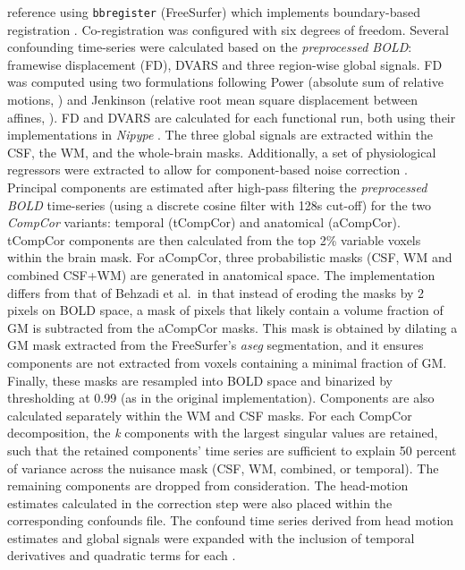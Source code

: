 \documentclass[
]{article}
\begin{document}
\begin{description}
reference using \texttt{bbregister} (FreeSurfer) which implements
boundary-based registration \citep{bbr}. Co-registration was configured
with six degrees of freedom. Several confounding time-series were
calculated based on the \emph{preprocessed BOLD}: framewise displacement
(FD), DVARS and three region-wise global signals. FD was computed using
two formulations following Power (absolute sum of relative motions,
\citet{power_fd_dvars}) and Jenkinson (relative root mean square
displacement between affines, \citet{mcflirt}). FD and DVARS are
calculated for each functional run, both using their implementations in
\emph{Nipype} \citep[following the definitions by][]{power_fd_dvars}.
The three global signals are extracted within the CSF, the WM, and the
whole-brain masks. Additionally, a set of physiological regressors were
extracted to allow for component-based noise correction
\citep[\emph{CompCor},][]{compcor}. Principal components are estimated
after high-pass filtering the \emph{preprocessed BOLD} time-series
(using a discrete cosine filter with 128s cut-off) for the two
\emph{CompCor} variants: temporal (tCompCor) and anatomical (aCompCor).
tCompCor components are then calculated from the top 2\% variable voxels
within the brain mask. For aCompCor, three probabilistic masks (CSF, WM
and combined CSF+WM) are generated in anatomical space. The
implementation differs from that of Behzadi et al.~in that instead of
eroding the masks by 2 pixels on BOLD space, a mask of pixels that
likely contain a volume fraction of GM is subtracted from the aCompCor
masks. This mask is obtained by dilating a GM mask extracted from the
FreeSurfer's \emph{aseg} segmentation, and it ensures components are not
extracted from voxels containing a minimal fraction of GM. Finally,
these masks are resampled into BOLD space and binarized by thresholding
at 0.99 (as in the original implementation). Components are also
calculated separately within the WM and CSF masks. For each CompCor
decomposition, the \emph{k} components with the largest singular values
are retained, such that the retained components' time series are
sufficient to explain 50 percent of variance across the nuisance mask
(CSF, WM, combined, or temporal). The remaining components are dropped
from consideration. The head-motion estimates calculated in the
correction step were also placed within the corresponding confounds
file. The confound time series derived from head motion estimates and
global signals were expanded with the inclusion of temporal derivatives
and quadratic terms for each \citep{confounds_satterthwaite_2013}.

\end{description}
\end{document}
